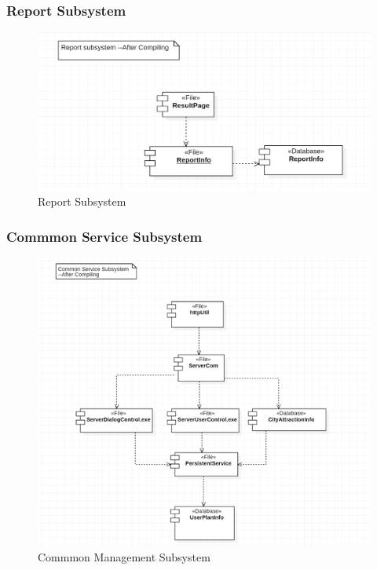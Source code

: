 \documentclass[10pt]{article}
\begin{document}
\subsubsection{Report Subsystem}
\begin{figure}[H]
    \centering
    
    \includegraphics[width=14cm]{reportafter.png}
    \caption{Report Subsystem}
    \label{Report Subsystem 2}
\end{figure}

\subsubsection{Commmon Service Subsystem}
\begin{figure}[H]
    \centering
    
    \includegraphics[width=14cm]{commonafter.png}
    \caption{Commmon Management Subsystem}
    \label{Commmon Management Subsystem 2}
\end{figure}
\end{document}
